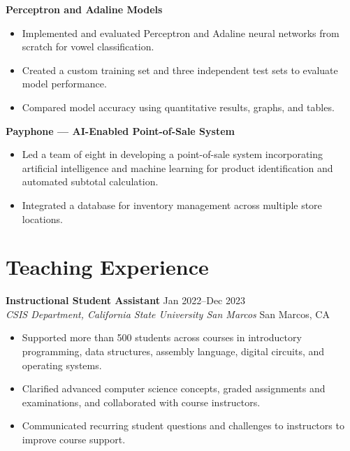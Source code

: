 \documentclass[11pt]{article}
\begin{document}
\vspace{0.4em}

\noindent
    \textbf{Perceptron and Adaline Models}
    \begin{itemize}
        \item Implemented and evaluated Perceptron and Adaline neural networks from scratch for vowel classification.
        \item Created a custom training set and three independent test sets to evaluate model performance.
        \item Compared model accuracy using quantitative results, graphs, and tables.
    \end{itemize}

\vspace{0.4em}

\noindent
    \textbf{Payphone --- AI-Enabled Point-of-Sale System}
    \begin{itemize}
        \item Led a team of eight in developing a point-of-sale system incorporating artificial intelligence and machine learning for product identification and automated subtotal calculation.
        \item Integrated a database for inventory management across multiple store locations.
    \end{itemize}


\section{Teaching Experience}

\noindent
    \textbf{Instructional Student Assistant} \hfill Jan 2022--Dec 2023\\
    \textit{CSIS Department, California State University San Marcos}
    \hfill San Marcos, CA
    \begin{itemize}
        \item Supported more than 500 students across courses in introductory programming, data structures, assembly language, digital circuits, and operating systems.
        \item Clarified advanced computer science concepts, graded assignments and examinations, and collaborated with course instructors.
        \item Communicated recurring student questions and challenges to instructors to improve course support.
    \end{itemize}
\end{document}
